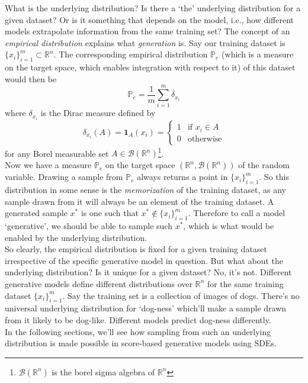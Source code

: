 \documentclass[11pt]{amsart}
\theoremstyle{plain}
\theoremstyle{definition}
\theoremstyle{remark}
\numberwithin{equation}{section}
\begin{document}
{What is the underlying distribution? Is there a `the' underlying distribution for a given dataset? Or is it something that depends on the model, i.e., how different models extrapolate information from the same training set? The concept of an \textit{empirical distribution} explains what \textit{generation} is. Say our training dataset is $\{x_i\}_{i=1}^m \subset \mathbb{R}^n$. The corresponding empirical distribution $\mathbb{P}_e$ (which is a measure on the target space, which enables integration with respect to it) of this dataset would then be
\begin{equation}
\mathbb{P}_e = \frac{1}{m}\sum_{i=1}^m \delta_{x_i}
\label{emp}
\end{equation}
where $\delta_{x_i}$ is the Dirac measure defined by
\[
\delta_{x_i}(A) = \mathbf{1}_A(x_i) = \begin{cases} 1 & \text{if } x_i \in A \\ 0 & \text{otherwise} \end{cases}
\]
for any Borel measurable set $A \in \mathcal{B}(\mathbb{R}^n)$\footnote{$\mathcal{B}(\mathbb{R}^n)$ is the borel sigma algebra of $\mathbb{R}^n$}.\\

Now we have a measure $\mathbb{P}_e$ on the target space $(\mathbb{R}^n,\mathcal{B}(\mathbb{R}^n))$ of the random variable. Drawing a sample from $\mathbb{P}_e$ always returns a point in $\{x_i\}_{i=1}^m$. So this distribution in some sense is the \textit{memorization} of the training dataset, as any sample drawn from it will always be an element of the training dataset. A generated sample $x^*$ is one such that $x^* \notin \{x_i\}_{i=1}^m$. Therefore to call a model `generative', we should be able to sample such $x^*$, which is what would be enabled by the underlying distribution.\\

So clearly, the empirical distribution is fixed for a given training dataset irrespective of the specific generative model in question. But what about the underlying distribution? Is it unique for a given dataset? No, it's not. Different generative models define different distributions over $\mathbb{R}^n$ for the same training dataset $\{x_i\}_{i=1}^m$. Say the training set is a collection of images of dogs. There's no universal underlying distribution for `dog-ness' which'll make a sample drawn from it likely to be dog-like. Different models predict dog-ness differently.\\

In the following sections, we'll see how sampling from such an underlying distribution is made possible in score-based generative models using SDEs.


}
\end{document}
